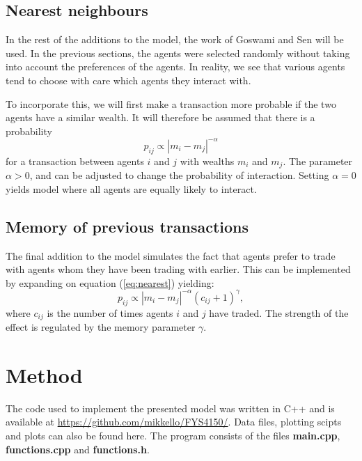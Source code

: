 \documentclass[11pt,a4paper,titlepage]{article}
\begin{document}
\subsection{Nearest neighbours}
In the rest of the additions to the model, the work of Goswami and Sen \cite{Goswami} will be used. In the previous sections, the agents were selected randomly without taking into account the preferences of the agents. In reality, we see that various agents tend to choose with care which agents they interact with.

To incorporate this, we will first make a transaction more probable if the two agents have a similar wealth. It will therefore be assumed that there is a probability
\begin{equation}
\label{eq:nearest}
p_{ij} \propto |m_i - m_j|^{-\alpha}
\end{equation}
for a transaction between agents $i$ and $j$ with wealths $m_i$ and $m_j$. The parameter $\alpha > 0$, and can be adjusted to change the probability of interaction. Setting $\alpha = 0$ yields model where all agents are equally likely to interact. 

\subsection{Memory of previous transactions} 
The final addition to the model simulates the fact that agents prefer to trade with agents whom they have been trading with earlier. This can be implemented by expanding on equation (\ref{eq:nearest}) yielding:
\begin{equation}
p_{ij} \propto |m_i - m_j|^{-\alpha}(c_{ij}+1)^{\gamma},
\end{equation}
where $c_{ij}$ is the number of times agents $i$ and $j$ have traded. The strength of the effect is regulated by the memory parameter $\gamma$.

\section{Method}
The code used to implement the presented model was written in C++ and is available at \url{https://github.com/mikkello/FYS4150/}. Data files, plotting scipts and plots can also be found here. The program consists of the files \textbf{main.cpp}, \textbf{functions.cpp} and \textbf{functions.h}.
\end{document}

